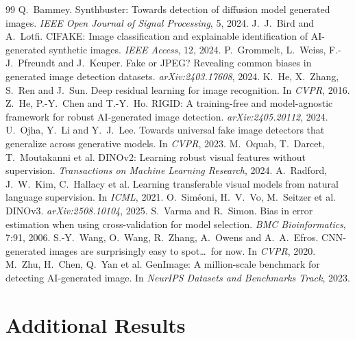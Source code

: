 \documentclass[10pt,a4paper]{article}
\begin{document}
\clearpage
\begin{thebibliography}{99}\small
{} Q.~Bammey. Synthbuster: Towards detection of diffusion model generated images. \emph{IEEE Open Journal of Signal Processing}, 5, 2024.
 J.~J.~Bird and A.~Lotfi. CIFAKE: Image classification and explainable identification of AI-generated synthetic images. \emph{IEEE Access}, 12, 2024.
 P.~Grommelt, L.~Weiss, F.-J.~Pfreundt and J.~Keuper. Fake or JPEG? Revealing common biases in generated image detection datasets. \emph{arXiv:2403.17608}, 2024.
 K.~He, X.~Zhang, S.~Ren and J.~Sun. Deep residual learning for image recognition. In \emph{CVPR}, 2016.
 Z.~He, P.-Y.~Chen and T.-Y.~Ho. RIGID: A training-free and model-agnostic framework for robust AI-generated image detection. \emph{arXiv:2405.20112}, 2024.
 U.~Ojha, Y.~Li and Y.~J.~Lee. Towards universal fake image detectors that generalize across generative models. In \emph{CVPR}, 2023.
 M.~Oquab, T.~Darcet, T.~Moutakanni et al. DINOv2: Learning robust visual features without supervision. \emph{Transactions on Machine Learning Research}, 2024.
 A.~Radford, J.~W.~Kim, C.~Hallacy et al. Learning transferable visual models from natural language supervision. In \emph{ICML}, 2021.
 O.~Sim\'eoni, H.~V.~Vo, M.~Seitzer et al. DINOv3. \emph{arXiv:2508.10104}, 2025.
 S.~Varma and R.~Simon. Bias in error estimation when using cross-validation for model selection. \emph{BMC Bioinformatics}, 7:91, 2006.
 S.-Y.~Wang, O.~Wang, R.~Zhang, A.~Owens and A.~A.~Efros. CNN-generated images are surprisingly easy to spot\ldots\ for now. In \emph{CVPR}, 2020.
 M.~Zhu, H.~Chen, Q.~Yan et al. GenImage: A million-scale benchmark for detecting AI-generated image. In \emph{NeurIPS Datasets and Benchmarks Track}, 2023.
\end{thebibliography}

\clearpage
\appendix
\sloppy
\section{Additional Results}\label{app:pergen}
\end{document}
